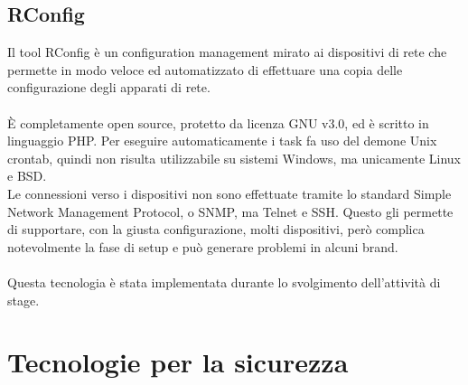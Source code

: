 \documentclass[Tesi.tex]{subfiles}
\begin{document}
\subsection{RConfig}
Il tool RConfig è un configuration management mirato ai dispositivi di rete che permette in modo veloce ed automatizzato di effettuare una copia delle configurazione degli apparati di rete. \\\\
\`{E} completamente open source, protetto da licenza GNU v3.0, ed è scritto in linguaggio PHP. Per eseguire automaticamente i task fa uso del demone Unix crontab, quindi non risulta utilizzabile su sistemi Windows, ma unicamente Linux e BSD. \\
Le connessioni verso i dispositivi non sono effettuate tramite lo standard Simple Network Management Protocol, o SNMP, ma Telnet e SSH. Questo gli permette di supportare, con la giusta configurazione, molti dispositivi, però complica notevolmente la fase di setup e può generare problemi in alcuni brand.\\\\
Questa tecnologia è stata implementata durante lo svolgimento dell'attività di stage.

\newpage
\section{Tecnologie per la sicurezza}
\end{document}
